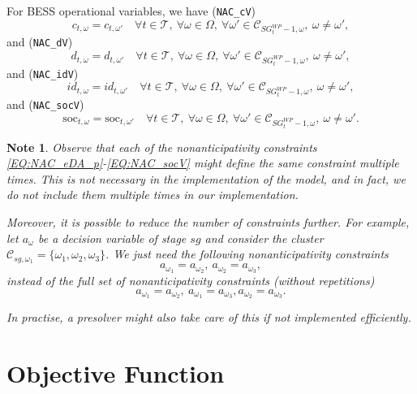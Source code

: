 \documentclass{article}
\newcommand{\soc}{\text{soc}}
\newtheorem{note}{Note}[section]
\begin{document}
For BESS operational variables, we have (\verb|NAC_cV|)
\begin{equation} \label{EQ:NAC_cV}
	c_{t, \omega} = c_{t, \omega'} \quad \forall t \in \mathcal{T}, \ \forall \omega \in \Omega, \ \forall \omega' \in \mathcal{C}_{SG^{WP}_t - 1, \omega}, \ \omega \neq \omega',
\end{equation}
and (\verb|NAC_dV|)
\begin{equation} \label{EQ:NAC_dV}
	d_{t, \omega} = d_{t, \omega'} \quad \forall t \in \mathcal{T}, \ \forall \omega \in \Omega, \ \forall \omega' \in \mathcal{C}_{SG^{WP}_t - 1, \omega}, \ \omega \neq \omega',
\end{equation}
and (\verb|NAC_idV|)
\begin{equation} \label{EQ:NAC_idV}
	id_{t, \omega} = id_{t, \omega'} \quad \forall t \in \mathcal{T}, \ \forall \omega \in \Omega, \ \forall \omega' \in \mathcal{C}_{SG^{WP}_t - 1, \omega}, \ \omega \neq \omega',
\end{equation}
and (\verb|NAC_socV|)
\begin{equation} \label{EQ:NAC_socV}
	\soc_{t, \omega} = \soc_{t, \omega'} \quad \forall t \in \mathcal{T}, \ \forall \omega \in \Omega, \ \forall \omega' \in \mathcal{C}_{SG^{WP}_t - 1, \omega}, \ \omega \neq \omega'.
\end{equation}

\begin{note}
Observe that each of the nonanticipativity constraints \eqref{EQ:NAC_eDA_p}-\eqref{EQ:NAC_socV} might define the same constraint multiple times. This is not necessary in the implementation of the model, and in fact, we do not include them multiple times in our implementation.
	
Moreover, it is possible to reduce the number of constraints further. For example, let $a_{\omega}$ be a decision variable of stage $sg$ and consider the cluster $\mathcal{C}_{sg, \omega_1} = \{ \omega_1, \omega_2, \omega_3 \}$. We just need the following nonanticipativity constraints 
$$
a_{\omega_1} = a_{\omega_2}, \ a_{\omega_2} = a_{\omega_3},
$$
instead of the full set of nonanticipativity constraints (without repetitions)
$$
a_{\omega_1} = a_{\omega_2}, \ a_{\omega_1} = a_{\omega_3}, a_{\omega_2} = a_{\omega_3}.
$$

In practise, a presolver might also take care of this if not implemented efficiently.	
\end{note}


\section{Objective Function}
\label{SEC:ObjectiveFunction}
\end{document}

